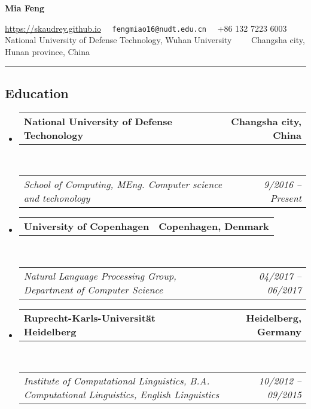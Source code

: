 \documentclass[10pt,letterpaper]{article}
\makeatletter
\newcommand{\headerrow}[2]
{\begin{tabular*}{\linewidth}{l@{\extracolsep{\fill}}r}
	#1 &
	#2 \\
\end{tabular*}}
\makeatother
\begin{document}
\begin{center}
{\LARGE \textbf{Mia Feng}}

\url{https://skaudrey.github.io} \textbullet
\ \ \texttt{fengmiao16@nudt.edu.cn} \textbullet
\ \ +86 132 7223 6003 
\\
National University of Defense Technology, Wuhan University\ \ \textbullet
\ \ Changsha city, Hunan province, China
\end{center}


\hrule
\vspace{-0.4em}
\subsection*{Education}

\begin{itemize}
	\parskip=0.1em
	
	\item 
	\headerrow
		{\textbf{National University of Defense Techonology}}
		{\textbf{Changsha city, China}}
	\\
	\headerrow
		{\emph{School of Computing, MEng. Computer science and techonology}}
		{\emph{9/2016 -- Present}}
	
	\item 
	\headerrow
		{\textbf{University of Copenhagen}}
		{\textbf{Copenhagen, Denmark}}
	\\
	\headerrow
		{\emph{Natural Language Processing Group, Department of Computer Science}}
		{\emph{04/2017 -- 06/2017}}

	\item 
	\headerrow
		{\textbf{Ruprecht-Karls-Universität Heidelberg}}
		{\textbf{Heidelberg, Germany}}
	\\
	\headerrow
		{\emph{Institute of Computational Linguistics, B.A. Computational Linguistics, English Linguistics}}
		{\emph{10/2012 -- 09/2015}}
	

\end{itemize}
\end{document}
